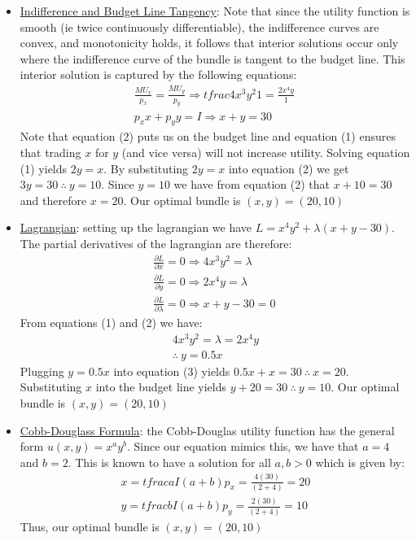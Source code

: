 \documentclass{article}
\begin{document}
  \begin{itemize}
    \item  \underline{Indifference and Budget Line Tangency}: Note that since the utility function is smooth (ie twice continuously differentiable), the indifference curves are convex, and monotonicity holds, it follows that interior solutions occur only where the indifference curve of the bundle is tangent to the budget line. This interior solution is captured by the following equations:
    \begin{gather*}
      \frac{MU_{x}}{p_{x}} = \frac{MU_{y}}{p_{y}} \Rightarrow tfrac{4x^{3}y^{2}}{1} = \frac{2x^{4}y}{1} \ \tag{1} \\
      p_{x}x + p_{y}y = I \Rightarrow x + y = 30 \ \tag{2}
    \end{gather*}
    Note that equation (2) puts us on the budget line and equation (1) ensures that trading $x$ for $y$ (and vice versa) will not increase utility. Solving equation (1) yields $2y = x$. By substituting $2y = x$ into equation (2) we get $3y = 30 \ \therefore \ y = 10$. Since $y=10$ we have from equation (2) that $x + 10 = 30$ and therefore $x = 20$. Our optimal bundle is $(x,y) = (20, 10)$
    \item  \underline{Lagrangian}: setting up the lagrangian we have $L = x^{4}y^{2} + \lambda (x + y - 30)$. The partial derivatives of the lagrangian are therefore:
    \begin{gather*}
      \frac{\partial L}{\partial x} = 0 \Rightarrow 4x^{3}y^{2} = \lambda \ \tag{1} \\
      \frac{\partial L}{\partial y} = 0 \Rightarrow 2x^{4}y = \lambda \ \tag{2} \\
      \frac{\partial L}{\partial \lambda} = 0 \Rightarrow x + y - 30 = 0 \ \tag{3}
    \end{gather*}
    From equations (1) and (2) we have:
    \begin{gather*}
      4x^{3}y^{2} = \lambda = 2x^{4}y \\
      \therefore \ y = 0.5x
    \end{gather*}
    Plugging $y = 0.5x$ into equation (3) yields $0.5x + x = 30 \ \therefore \ x = 20$. Substituting $x$ into the budget line yields $y + 20 = 30 \ \therefore \ y = 10$. Our optimal bundle is $(x,y) = (20, 10)$
    \item  \underline{Cobb-Douglass Formula}: the Cobb-Douglas utility function has the general form $u(x,y) = x^{a}y^{b}$. Since our equation mimics this, we have that $a=4$ and $b=2$. This is known to have a solution for all $a,b > 0$ which is given by:
    \begin{gather*}
      x = tfrac{aI}{(a+b)p_{x}} = \tfrac{4(30)}{(2+4)} = 20 \\
      y = tfrac{bI}{(a+b)p_{y}} = \tfrac{2(30)}{(2+4)} = 10
    \end{gather*}
    Thus, our optimal bundle is $(x,y) = (20, 10)$
  \end{itemize}
  \par
\vspace{6mm}
\end{document}
